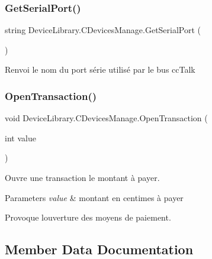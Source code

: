 \subsubsection{\texorpdfstring{Get\+Serial\+Port()}{GetSerialPort()}}
{\footnotesize\ttfamily string Device\+Library.\+C\+Devices\+Manage.\+Get\+Serial\+Port (\begin{DoxyParamCaption}{ }\end{DoxyParamCaption})\hspace{0.3cm}{\ttfamily [inline]}}



Renvoi le nom du port série utilisé par le bus cc\+Talk 

\mbox{\label{class_device_library_1_1_c_devices_manage_a207100abcf87d3e21768d5284d84a100}} 
\subsubsection{\texorpdfstring{Open\+Transaction()}{OpenTransaction()}}
{\footnotesize\ttfamily void Device\+Library.\+C\+Devices\+Manage.\+Open\+Transaction (\begin{DoxyParamCaption}\item[{int}]{value }\end{DoxyParamCaption})\hspace{0.3cm}{\ttfamily [inline]}}



Ouvre une transaction le montant à payer. 


\begin{DoxyParams}{Parameters}
{\em value} & montant en centimes à payer\\
\hline
\end{DoxyParams}


Provoque l\textquotesingle{}ouverture des moyens de paiement.

\subsection{Member Data Documentation}
\mbox{\label{class_device_library_1_1_c_devices_manage_ae9d4323b152f0a1767c004668d2ab3ea}} 
